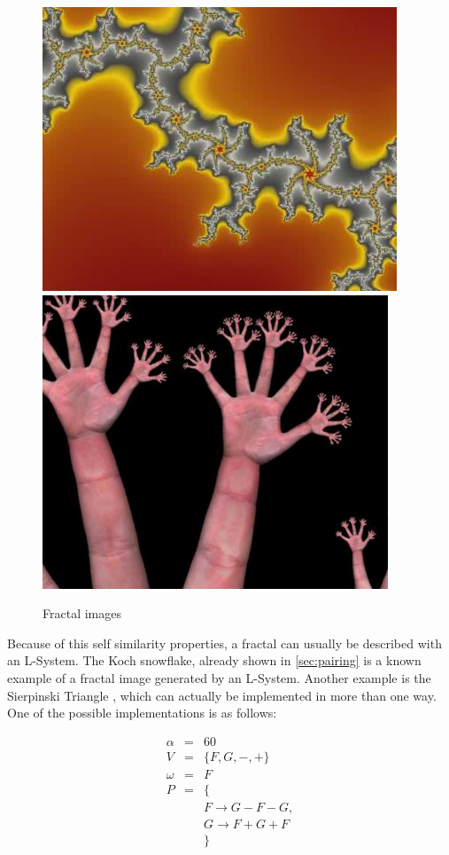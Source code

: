 \documentclass{acmtog}
\begin{document}
\begin{figure}[!htp]
  \begin{center}
    \includegraphics[width=0.8\columnwidth]{images/5_1_fractal}
    \includegraphics[width=0.8\columnwidth]{images/5_2_fractal}
    \caption{Fractal images \label{fig:fractais}}
    \end{center}
\end{figure}

Because of this self similarity properties, a fractal can usually be described with an L-System. The Koch snowflake, already shown in \autoref{sec:pairing} is a known example of a fractal image generated by an L-System. Another example is the Sierpinski Triangle \cite{FRACTALS}, which can actually be implemented in more than one way. One of the possible implementations is as follows:

\begin{eqnarray*}
  \alpha  &=& 60                        \\
  V       &=& \{F, G, -, +\}            \\
  \omega  &=& F                         \\
  P       &=& \{                        \\
          & & F \rightarrow G-F-G,      \\
          & & G \rightarrow F+G+F       \\
          & & \}                        
\end{eqnarray*}
\end{document}
